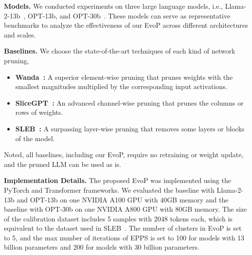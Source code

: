 \noindent\textbf{Models.} We conducted experiments on three large language models, i.e., Llama-2-13b~\cite{llama2}, OPT-13b, and OPT-30b~\cite{opt}.
These models can serve as representative benchmarks to analyze the effectiveness of our EvoP across different architectures and scales.

\noindent\textbf{Baselines.} We choose the state-of-the-art techniques of each kind of network pruning,
\begin{itemize}[nosep]
    \item \textbf{Wanda~\cite{wanda}:} A superior element-wise pruning that prunes weights with the smallest magnitudes multiplied by the corresponding input activations.
    \item \textbf{SliceGPT~\cite{slicegpt}:} An advanced channel-wise pruning that prunes the columns or rows of weights.
    \item \textbf{SLEB~\cite{sleb}:} A surpassing layer-wise pruning that removes some layers or blocks of the model.
\end{itemize}
Noted, all baselines, including our EvoP, require no retraining or weight update, and the pruned LLM can be used as is.

\noindent\textbf{Implementation Details.} The proposed EvoP was implemented using the PyTorch and Transformer frameworks.
We evaluated the baseline with Llama-2-13b and OPT-13b on one NVIDIA A100 GPU with 40GB memory and 
the baseline with OPT-30b on one NVIDIA A800 GPU with 80GB memory.
The size of the calibration dataset includes 5 samples with 2048 tokens each, which is equivalent to the dataset used in SLEB~\cite{sleb}.
The number of clusters in EvoP is set to 5, and the max number of iterations of EPPS is set to 100 for models with 13 billion parameters and 200 for models with 30 billion parameters.



